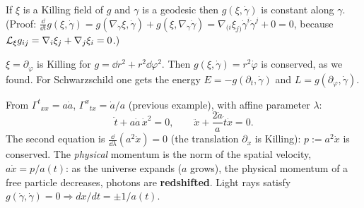 \begin{formal}
If $\xi$ is a Killing field of $g$ and $\gamma$ is a geodesic then $g(\xi,\dot\gamma)$ is constant along $\gamma$. (Proof: $\frac{\dd}{\dd t}g(\xi,\dot\gamma)=g(\nabla_{\dot\gamma}\xi,\dot\gamma)+g(\xi,\nabla_{\dot\gamma}\dot\gamma)=\nabla_{(i}\xi_{j)}\dot\gamma^i\dot\gamma^j+0=0$, because $\mathcal{L}_\xi g_{ij}=\nabla_i\xi_j+\nabla_j\xi_i=0$.)
\end{formal}
\begin{example}
$\xi=\partial_\varphi$ is Killing for $g=\dd r^2+r^2\dd\varphi^2$. Then $g(\xi,\dot\gamma)=r^2\dot\varphi$ is conserved, as we found. For Schwarzschild one gets the energy $E=-g(\partial_t,\dot\gamma)$ and $L=g(\partial_\varphi,\dot\gamma)$.
\end{example}

\begin{example}
From $\Gamma^t{}_{xx}=a\dot a$, $\Gamma^x{}_{tx}=\dot a/a$ (previous example), with affine parameter $\lambda$:
\[
\ddot t+a\dot a\,\dot x^2=0,\qquad\ddot x+\frac{2\dot a}{a}\dot t\dot x=0 .
\]
The second equation is $\frac{\dd}{\dd\lambda}(a^2\dot x)=0$ (the translation $\partial_x$ is Killing): $p:=a^2\dot x$ is conserved. The \emph{physical} momentum is the norm of the spatial velocity, $a\dot x=p/a(t)$: as the universe expands ($a$ grows), the physical momentum of a free particle decreases, \ie photons are \textbf{redshifted}. Light rays satisfy $g(\dot\gamma,\dot\gamma)=0\Rightarrow dx/dt=\pm1/a(t)$.
\end{example}

